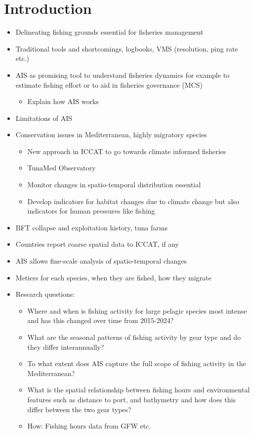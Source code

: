 \chapter{Introduction}

\begin{itemize}
    \item Delineating fishing grounds essential for fisheries management
    \item Traditional tools and shortcomings, logbooks, VMS (resolution, ping rate etc.)
    \item AIS as promising tool to understand fisheries dynamics for example to estimate fishing effort or to aid in fisheries governance (MCS)
    \begin{itemize}
        \item Explain how AIS works
    \end{itemize}
    \item Limitations of AIS
    \item Conservation issues in Mediterranean, highly migratory species
    \begin{itemize}
        \item New approach in ICCAT to go towards climate informed fisheries
        \item TunaMed Observatory
        \item Monitor changes in spatio-temporal distribution essential
        \item Develop indicators for habitat changes due to climate change but also indicators for human pressures like fishing
    \end{itemize}
    \item BFT collapse and exploitation history, tuna farms
    \item Countries report coarse spatial data to ICCAT, if any
    \item AIS allows fine-scale analysis of spatio-temporal changes
    \item Metiers for each species, when they are fished, how they migrate
    \item Research questions:
    \begin{itemize}
        \item Where and when is fishing activity for large pelagic species most intense and has this changed over time from 2015-2024?
        \item What are the seasonal patterns of fishing activity by gear type and do they differ interannually?
        \item To what extent does AIS capture the full scope of fishing activity in the Mediterranean?
        \item What is the spatial relationship between fishing hours and environmental features such as distance to port, and bathymetry
              and how does this differ between the two gear types?
        \item How: Fishing hours data from GFW etc.

    \end{itemize}
\end{itemize}

